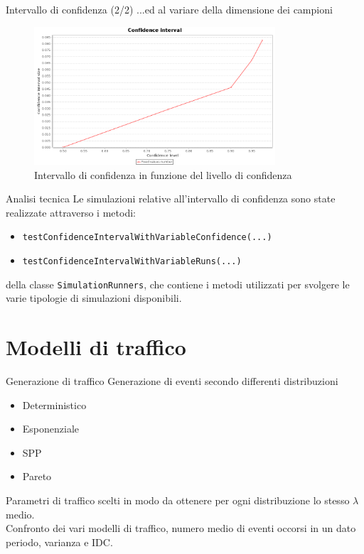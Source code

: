 \documentclass[slidestop,compress,mathserif]{beamer}
\begin{document}
\begin{frame}{Intervallo di confidenza (2/2)}
...ed al variare della dimensione dei campioni
\begin{figure}[!h]{
	\begin{center}
	   \includegraphics[width=0.8\textwidth]{figures/IDC_2.png}
	\end{center}}
	\caption{Intervallo di confidenza in funzione del livello di confidenza}
	\label{fig:idc2}
\end{figure}
\end{frame}

\begin{frame}{Analisi tecnica}
\vfill
Le simulazioni relative all'intervallo di confidenza sono state realizzate attraverso i metodi:
\begin{itemize}
\footnotesize
\item {\tt testConfidenceIntervalWithVariableConfidence(...)} 
\item {\tt testConfidenceIntervalWithVariableRuns(...)}
\end{itemize} 
\normalsize
della classe {\tt SimulationRunners}, che contiene i metodi utilizzati per svolgere le varie tipologie di simulazioni disponibili.
\vfill
\end{frame}

\section{Modelli di traffico}
\begin{frame}{Generazione di traffico}
\vfill
Generazione di eventi secondo differenti distribuzioni
\begin{itemize}
		\item Deterministico
		\item Esponenziale
		\item SPP
		\item Pareto
\end{itemize}
Parametri di traffico scelti in modo da ottenere per ogni distribuzione lo stesso $\lambda$ medio.\\
Confronto dei vari modelli di traffico, numero medio di eventi occorsi in un dato periodo, varianza e IDC.
\vfill
\end{frame}
\end{document}
